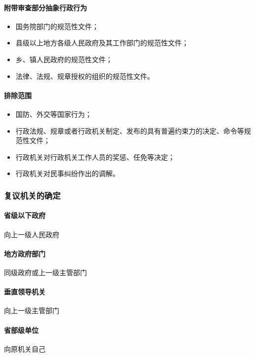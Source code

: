 \paragraph{附带审查部分抽象行政行为}

\begin{itemize}
	\item 国务院部门的规范性文件；
	\item 县级以上地方各级人民政府及其工作部门的规范性文件；
	\item 乡、镇人民政府的规范性文件；
	\item 法律、法规、规章授权的组织的规范性文件。
\end{itemize}

\paragraph{排除范围}

\begin{itemize}
	\item 国防、外交等国家行为；
	\item 行政法规、规章或者行政机关制定、发布的具有普遍约束力的决定、命令等规范性文件；
	\item 行政机关对行政机关工作人员的奖惩、任免等决定；
	\item 行政机关对民事纠纷作出的调解。
\end{itemize}

\subsubsection{复议机关的确定}

\paragraph{省级以下政府} 向上一级人民政府

\paragraph{地方政府部门} 同级政府或上一级主管部门

\paragraph{垂直领导机关} 向上一级主管部门

\paragraph{省部级单位} 向原机关自己

